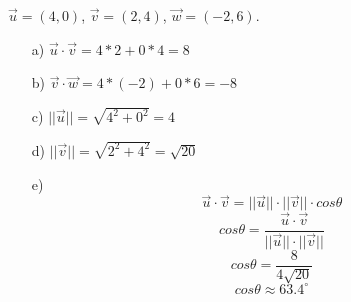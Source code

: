 $\vec{u} = (4,0)$, $\vec{v} = (2,4)$, $\vec{w} = (-2,6)$.
\begin{itemize}
\item[a) ] $\vec{u} \cdot \vec{v} = 4*2 + 0*4 = 8$  
\item[b) ] $\vec{v} \cdot \vec{w} = 4*(-2) + 0*6 = -8$
\item[c) ] $||\vec{u}|| = \sqrt{4^2 + 0^2} = 4$
\item[d) ] $||\vec{v}|| = \sqrt{2^2 + 4^2} = \sqrt{20}$
\item[e) ] 
\[\vec{u} \cdot \vec{v} = ||\vec{u}|| \cdot ||\vec{v}|| \cdot cos \theta\]
\[cos \theta = \frac{\vec{u} \cdot \vec{v} }{ ||\vec{u}|| \cdot ||\vec{v}|| } \]
\[cos \theta = \frac{ 8 }{ 4 \sqrt{20} } \]
\[cos \theta \approx 63.4^{\circ} \]
\end{itemize}